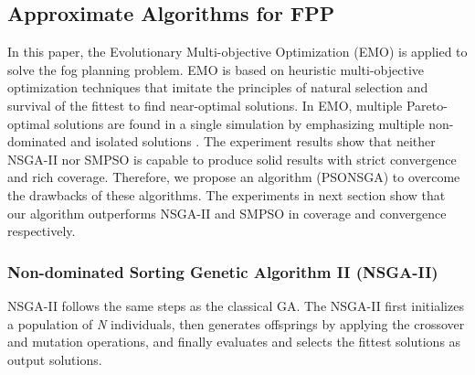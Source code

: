\documentclass[10pt,journal,compsoc]{IEEEtran}
\begin{document}

\subsection{Approximate Algorithms for FPP}\label{sec:approximate}
In this paper, the Evolutionary Multi-objective Optimization (EMO) is applied to solve the fog planning problem. EMO is based on heuristic multi-objective optimization techniques that imitate the principles of natural selection and survival of the fittest to find near-optimal solutions. In EMO, multiple Pareto-optimal solutions are found in a single simulation by emphasizing multiple non-dominated and isolated solutions \cite{Deb:2001:MOU:559152}. %
The experiment results show that neither NSGA-II nor SMPSO is capable to produce solid results with strict convergence and rich coverage. Therefore, we propose an algorithm (PSONSGA) to overcome the drawbacks of these algorithms. The experiments in next section show that our algorithm outperforms NSGA-II and SMPSO in coverage and convergence respectively.
\subsubsection{Non-dominated Sorting Genetic Algorithm II (NSGA-II)}
NSGA-II follows the same steps as the classical GA. 
The NSGA-II first initializes a population of \textit{N} individuals, then generates offsprings by applying the crossover and mutation operations, and finally evaluates and selects the fittest solutions as output solutions. 
\end{document}
